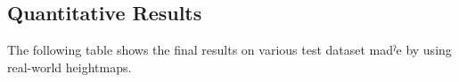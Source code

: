 \documentclass[../document.tex]{subfiles}
\begin{document}
\subsection{Quantitative Results}
The following table shows the final results on various test dataset madˀe by using real-world heightmaps. 
\end{document}
